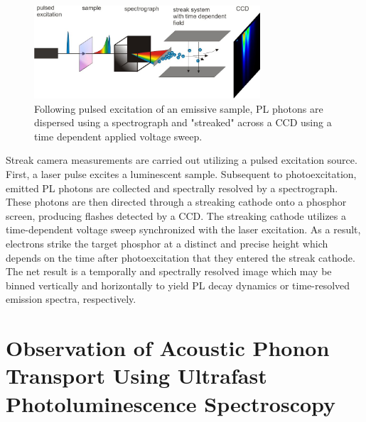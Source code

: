 \begin{figure}
\begin{center}
\includegraphics[width=0.75\textwidth]{./Chapter4/streakcam.jpeg}
\caption[Diagram of streak camera detection scheme.]{Following pulsed excitation of an emissive sample, PL photons are dispersed using a spectrograph and "streaked" across a CCD using a time dependent applied voltage sweep.}
\label{f:streakcam}
\end{center}
\end{figure}

Streak camera measurements are carried out utilizing a pulsed excitation source. First, a laser pulse excites a luminescent sample. Subsequent to photoexcitation, emitted PL photons are collected and spectrally resolved by a spectrograph. These photons are then directed through a streaking cathode onto a phosphor screen, producing flashes detected by a CCD. The streaking cathode utilizes a time-dependent voltage sweep synchronized with the laser excitation. As a result, electrons strike the target phosphor at a distinct and precise height which depends on the time after photoexcitation that they entered the streak cathode. The net result is a temporally and spectrally resolved image which may be binned vertically and horizontally to yield PL decay dynamics or time-resolved emission spectra, respectively.


\section{Observation of Acoustic Phonon Transport Using Ultrafast Photoluminescence Spectroscopy}

